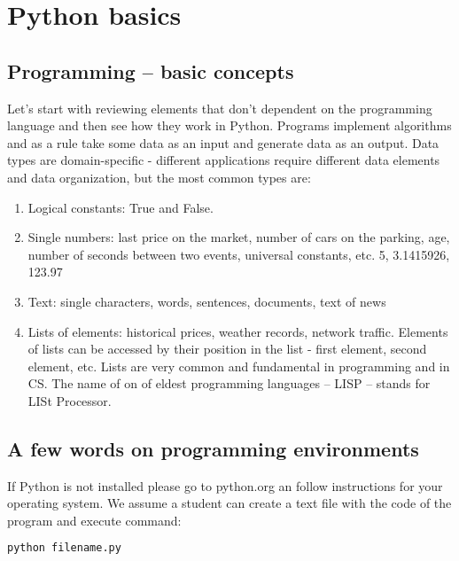 \chapter{Python basics}

\section{Programming -- basic concepts}

Let's start with reviewing elements that don't dependent
on the programming language and then see how they work in
Python. Programs implement algorithms and
as a rule take some data as an input and generate data as an output.
Data types are domain-specific - different applications require
different data elements and
data organization, but the most common types are:

\begin{leftborder}
\begin{enumerate}
\item Logical constants: True and False.
\item Single numbers: last price on the market, number of
cars on the parking, age, number of seconds between two events,
universal constants, etc. 5, 3.1415926, 123.97
\item Text: single characters, words, sentences, documents, text of news
\item Lists of elements: historical prices, weather records,
network traffic. Elements of lists can be accessed by their
position in the list - first element, second element, etc.
Lists are very common and fundamental in programming and in CS.
The name of on of eldest programming languages -- LISP --
stands for LISt Processor.
\end{enumerate}
\end{leftborder}

\section{A few words on programming environments}
If Python is not installed please go to python.org an follow
instructions for your operating system.
We assume a student can create a text file with the code of the program
and execute command:

\begin{lstlisting}[language=bash,style=codelst2,caption={Python: runnning program saved in filename.py}]
python filename.py
\end{lstlisting}

